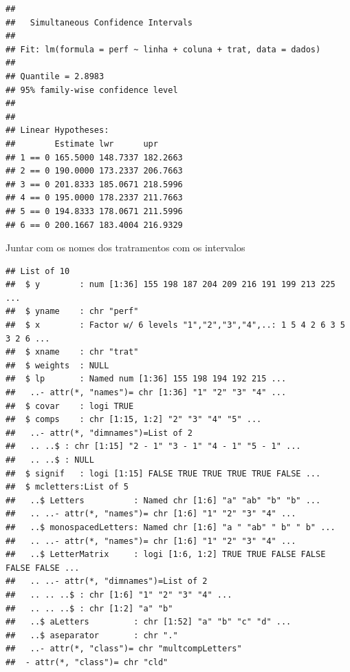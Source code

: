 \documentclass[
]{book}
\newenvironment{Shaded}{\begin{snugshade}}{\end{snugshade}}
\newcommand{\KeywordTok}[1]{\textcolor[rgb]{0.13,0.29,0.53}{\textbf{#1}}}
\newcommand{\NormalTok}[1]{#1}
\newcommand{\OperatorTok}[1]{\textcolor[rgb]{0.81,0.36,0.00}{\textbf{#1}}}
\newcommand{\StringTok}[1]{\textcolor[rgb]{0.31,0.60,0.02}{#1}}
\begin{document}
\begin{verbatim}
## 
##   Simultaneous Confidence Intervals
## 
## Fit: lm(formula = perf ~ linha + coluna + trat, data = dados)
## 
## Quantile = 2.8983
## 95% family-wise confidence level
##  
## 
## Linear Hypotheses:
##        Estimate lwr      upr     
## 1 == 0 165.5000 148.7337 182.2663
## 2 == 0 190.0000 173.2337 206.7663
## 3 == 0 201.8333 185.0671 218.5996
## 4 == 0 195.0000 178.2337 211.7663
## 5 == 0 194.8333 178.0671 211.5996
## 6 == 0 200.1667 183.4004 216.9329
\end{verbatim}

Juntar com os nomes dos tratramentos com os intervalos

\begin{Shaded}
\end{Shaded}

\begin{verbatim}
## List of 10
##  $ y        : num [1:36] 155 198 187 204 209 216 191 199 213 225 ...
##  $ yname    : chr "perf"
##  $ x        : Factor w/ 6 levels "1","2","3","4",..: 1 5 4 2 6 3 5 3 2 6 ...
##  $ xname    : chr "trat"
##  $ weights  : NULL
##  $ lp       : Named num [1:36] 155 198 194 192 215 ...
##   ..- attr(*, "names")= chr [1:36] "1" "2" "3" "4" ...
##  $ covar    : logi TRUE
##  $ comps    : chr [1:15, 1:2] "2" "3" "4" "5" ...
##   ..- attr(*, "dimnames")=List of 2
##   .. ..$ : chr [1:15] "2 - 1" "3 - 1" "4 - 1" "5 - 1" ...
##   .. ..$ : NULL
##  $ signif   : logi [1:15] FALSE TRUE TRUE TRUE TRUE FALSE ...
##  $ mcletters:List of 5
##   ..$ Letters          : Named chr [1:6] "a" "ab" "b" "b" ...
##   .. ..- attr(*, "names")= chr [1:6] "1" "2" "3" "4" ...
##   ..$ monospacedLetters: Named chr [1:6] "a " "ab" " b" " b" ...
##   .. ..- attr(*, "names")= chr [1:6] "1" "2" "3" "4" ...
##   ..$ LetterMatrix     : logi [1:6, 1:2] TRUE TRUE FALSE FALSE FALSE FALSE ...
##   .. ..- attr(*, "dimnames")=List of 2
##   .. .. ..$ : chr [1:6] "1" "2" "3" "4" ...
##   .. .. ..$ : chr [1:2] "a" "b"
##   ..$ aLetters         : chr [1:52] "a" "b" "c" "d" ...
##   ..$ aseparator       : chr "."
##   ..- attr(*, "class")= chr "multcompLetters"
##  - attr(*, "class")= chr "cld"
\end{verbatim}
\end{document}

